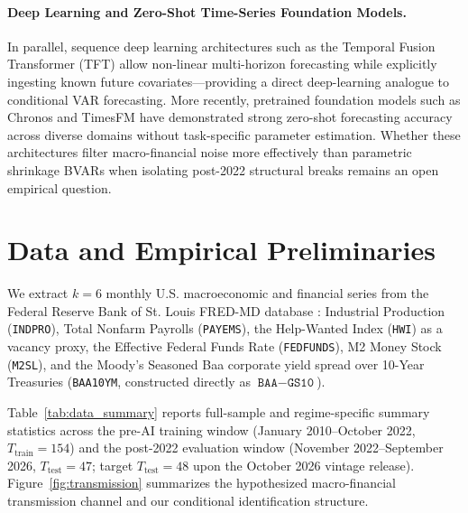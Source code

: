 \documentclass[11pt,a4paper]{article}
\begin{document}
\paragraph{Deep Learning and Zero-Shot Time-Series Foundation Models.}
In parallel, sequence deep learning architectures such as the Temporal Fusion Transformer (TFT) \citep{lim2021temporal} allow non-linear multi-horizon forecasting while explicitly ingesting known future covariates---providing a direct deep-learning analogue to conditional VAR forecasting. More recently, pretrained foundation models such as Chronos \citep{ansari2024chronos} and TimesFM \citep{das2024decoder} have demonstrated strong zero-shot forecasting accuracy across diverse domains without task-specific parameter estimation. Whether these architectures filter macro-financial noise more effectively than parametric shrinkage BVARs when isolating post-2022 structural breaks remains an open empirical question.

\section{Data and Empirical Preliminaries}
\label{sec:data}

We extract $k = 6$ monthly U.S. macroeconomic and financial series from the Federal Reserve Bank of St. Louis FRED-MD database \citep{mccracken2016fredmd}: Industrial Production (\texttt{INDPRO}), Total Nonfarm Payrolls (\texttt{PAYEMS}), the Help-Wanted Index (\texttt{HWI}) as a vacancy proxy, the Effective Federal Funds Rate (\texttt{FEDFUNDS}), M2 Money Stock (\texttt{M2SL}), and the Moody's Seasoned Baa corporate yield spread over 10-Year Treasuries (\texttt{BAA10YM}, constructed directly as $\texttt{BAA} - \texttt{GS10}$).



Table~\ref{tab:data_summary} reports full-sample and regime-specific summary statistics across the pre-AI training window (January 2010--October 2022, $T_{\text{train}} = 154$) and the post-2022 evaluation window (November 2022--September 2026, $T_{\text{test}} = 47$; target $T_{\text{test}} = 48$ upon the October 2026 vintage release). Figure~\ref{fig:transmission} summarizes the hypothesized macro-financial transmission channel and our conditional identification structure.
\end{document}
